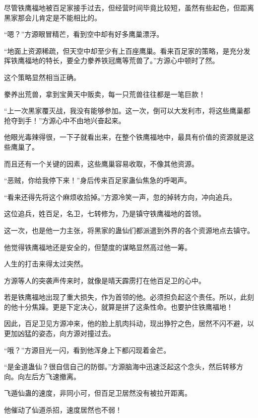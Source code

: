 
\begin{this_body}

尽管铁鹰福地被百足家接手过去，但经营时间毕竟比较短，虽然有些起色，但距离黑家那会儿肯定是不能相比的。

“嗯？”方源眼冒精芒，看到空中却有好多鹰巢漂浮。

“地面上资源稀疏，但天空中却至少有上百座鹰巢。看来百足家的策略，是充分发挥铁鹰福地的特长，要全力豢养铁冠鹰等荒兽了。”方源心中顿时了然。

这个策略显然相当正确。

豢养出荒兽，拿到宝黄天中贩卖，每一只荒兽往往都是一笔巨款！

“上一次黑家覆灭战，我没有能够参加。这一次，倒可以大发利市，将这些鹰巢都抢夺到手！”方源心中不由地兴奋起来。

他眼光毒辣得很，一下子就看出来，在整个铁鹰福地中，最具有价值的资源就是这些鹰巢了。

而且还有一个关键的因素，这些鹰巢容易收取，不像其他资源。

“恶贼，你给我停下来！”身后传来百足家蛊仙焦急的呼喝声。

“看来还得先将这个麻烦收拾掉。”方源冷笑一声，忽的掉转方向，冲向追兵。

这位追兵，姓百足，名卫，七转修为，乃是镇守铁鹰福地的首领。

这一次，也是他一力主张，将黑家的蛊仙们都派遣到外界的各个资源地点去镇守。

他觉得铁鹰福地还是安全的，但楚度的谋略显然高过他一筹。

人生的打击来得太过突然。

方源等人的突袭声传来时，就像是晴天霹雳打在他百足卫的心中。

若是铁鹰福地出现了重大损失，作为首领的他。必须担负起这个责任。所以，此刻的他十分焦躁。更是下定决心，就算是拼了这条性命。也要护住铁鹰福地！

因此，百足卫见方源冲来，他的脸上肌肉抖动，现出狰狞之色，居然不闪不避，以更加凶猛的姿态，向方源对撞过去。

“哦？”方源目光一闪，看到他浑身上下都闪现着金芒。

“是金道蛊仙？很自信自己的防御。”方源脑海中迅速泛起这个念头，然后转移方向。向左后方飞速撤离。

飞遁仙蛊的速度，非同小可，但百足卫居然没有被拉开距离。

他催动了仙道杀招，速度居然也不弱！


\end{this_body}
